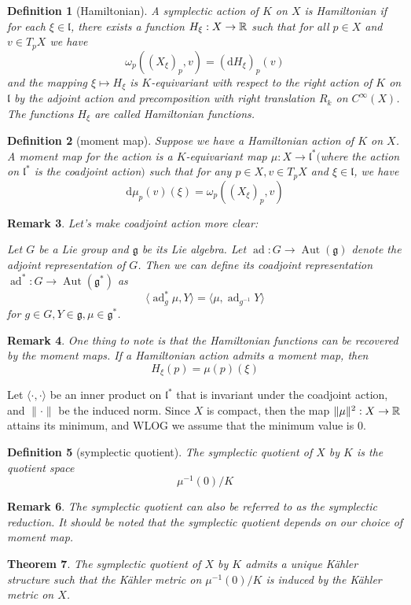 \documentclass[11pt]{amsart}
\numberwithin{equation}{section}
\theoremstyle{plain}
\theoremstyle{plain}
\newtheorem{thmsub}{Theorem}[subsection]
\newtheorem{defnsub}[thmsub]{Definition}
\newtheorem{remksub}[thmsub]{Remark}
\numberwithin{equation}{section}
\begin{document}
\begin{defnsub}[Hamiltonian]
A symplectic action of $K$ on $X$ is Hamiltonian if for each $\xi\in\mathfrak{l}$, there exists a function $H_{\xi}:X\to\Bbb{R}$ such that for all $p\in X$ and $v\in T_pX$ we have
$$
\omega_p((X_{\xi})_p,v)=(\mathrm{d}H_{\xi})_p(v)
$$
and the mapping $\xi\mapsto H_{\xi}$ is $K$-equivariant with respect to the right action of $K$ on $\mathfrak{l}$ by the adjoint action and precomposition with right translation $R_k$ on $C^{\infty}(X)$. The functions $H_{\xi}$ are called Hamiltonian functions.
\end{defnsub}
\begin{defnsub}[moment map]
Suppose we have a Hamiltonian action of $K$ on $X$. A moment map for the action is a $K$-equivariant map $\mu:X\to\mathfrak{l}^*$$($where the action on $\mathfrak{l}^*$ is the coadjoint action$)$ such that for any $p\in X,v\in T_pX$ and $\xi\in\mathfrak{l}$, we have
$$
\mathrm{d}\mu_p(v)(\xi)=\omega_p((X_{\xi})_p,v)
$$
\end{defnsub}
\begin{remksub}\normalfont
Let's make coadjoint action more clear:

Let $G$ be a Lie group and $\mathfrak{g}$ be its Lie algebra. Let $\operatorname{ad}:G\to\operatorname{Aut}(\mathfrak{g})$ denote the adjoint representation of $G$. Then we can define its coadjoint representation $\operatorname{ad}^*:G\to\operatorname{Aut}(\mathfrak{g}^*)$ as 
$$
\langle \operatorname{ad}_g^*\mu, Y\rangle=\langle\mu,\operatorname{ad}_{g^{-1}}Y\rangle
$$
for $g\in G,Y\in\mathfrak{g},\mu\in\mathfrak{g}^*$.
\end{remksub}
\begin{remksub}\normalfont
One thing to note is that the Hamiltonian functions can be recovered by the moment maps. If a Hamiltonian action admits a moment map, then
$$
H_{\xi}(p)=\mu(p)(\xi)
$$
\end{remksub}

Let $\langle\cdot,\cdot\rangle$ be an inner product on $\mathfrak{l}^*$ that is invariant under the coadjoint action, and $\|\cdot\|$ be the induced norm. Since $X$ is compact, then the map $\|\mu\|^2:X\to\Bbb{R}$ attains its minimum, and WLOG we assume that the minimum value is $0$.

\begin{defnsub}[symplectic quotient]
The symplectic quotient of $X$ by $K$ is the quotient space
$$
\mu^{-1}(0)/K
$$
\end{defnsub}
\begin{remksub}\normalfont
The symplectic quotient can also be referred to as the symplectic reduction. It should be noted that the symplectic quotient depends on our choice of moment map.
\end{remksub}
\begin{thmsub}
The symplectic quotient of $X$ by $K$ admits a unique Kähler structure such that the Kähler metric on $\mu^{-1}(0)/K$ is induced by the Kähler metric on $X$.
\end{thmsub}
\end{document}
